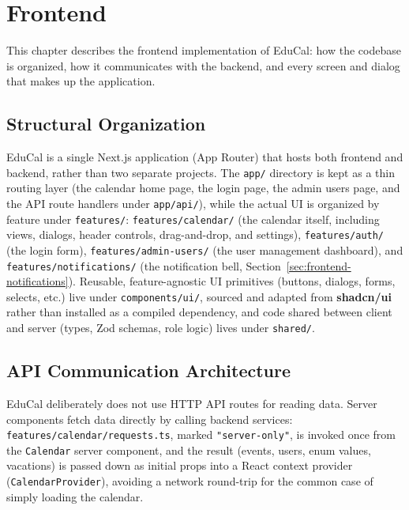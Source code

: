 %
%
\chapter{Frontend} \label{cap:frontend}

This chapter describes the frontend implementation of EduCal: how the codebase is organized, how it communicates with the backend, and every screen and dialog that makes up the application.

\section{Structural Organization} \label{sec:frontend-organization}

EduCal is a single Next.js application (App Router) that hosts both frontend and backend, rather than two separate projects. The \texttt{app/} directory is kept as a thin routing layer (the calendar home page, the login page, the admin users page, and the API route handlers under \texttt{app/api/}), while the actual UI is organized by feature under \texttt{features/}: \texttt{features/calendar/} (the calendar itself, including views, dialogs, header controls, drag-and-drop, and settings), \texttt{features/auth/} (the login form), \texttt{features/admin-users/} (the user management dashboard), and \texttt{features/notifications/} (the notification bell, Section~\ref{sec:frontend-notifications}). Reusable, feature-agnostic UI primitives (buttons, dialogs, forms, selects, etc.) live under \texttt{components/ui/}, sourced and adapted from \textbf{shadcn/ui} rather than installed as a compiled dependency, and code shared between client and server (types, Zod schemas, role logic) lives under \texttt{shared/}.

\section{API Communication Architecture} \label{sec:frontend-api}

EduCal deliberately does not use HTTP API routes for reading data. Server components fetch data directly by calling backend services: \texttt{features/calendar/requests.ts}, marked \texttt{"server-only"}, is invoked once from the \texttt{Calendar} server component, and the result (events, users, enum values, vacations) is passed down as initial props into a React context provider (\texttt{CalendarProvider}), avoiding a network round-trip for the common case of simply loading the calendar.

